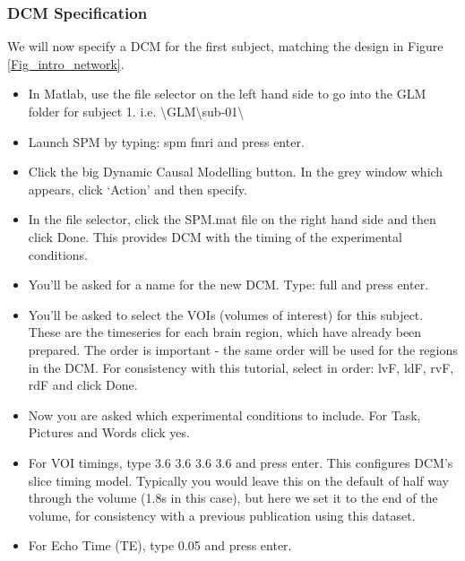 \documentclass{article}
\begin{document}
\subsubsection{DCM Specification} \label{GUI_specification}

We will now specify a DCM for the first subject, matching the design in Figure \ref{Fig_intro_network}.

\begin{itemize}
    
\item In Matlab, use the file selector on the left hand side to go into the GLM folder for subject 1. i.e. \textbackslash{GLM}\textbackslash{sub-01}\textbackslash

\item Launch SPM by typing: spm fmri and press enter.

\item Click the big Dynamic Causal Modelling button. In the grey window which appears, click `Action' and then specify.

\item In the file selector, click the SPM.mat file on the right hand side and then click Done. This provides DCM with the timing of the experimental conditions.

\item You'll be asked for a name for the new DCM. Type: full  and press enter.

\item You'll be asked to select the VOIs (volumes of interest) for this subject. These are the timeseries for each brain region, which have already been prepared. The order is important - the same order will be used for the regions in the DCM. For consistency with this tutorial, select in order: lvF, ldF, rvF, rdF and click Done.

\item Now you are asked which experimental conditions to include. For Task, Pictures and Words click yes.

\item For VOI timings, type 3.6  3.6  3.6  3.6 and press enter. This configures DCM's slice timing model. Typically you would leave this on the default of half way through the volume (1.8s in this case), but here we set it to the end of the volume, for consistency with a previous publication using this dataset.

\item For Echo Time (TE), type 0.05 and press enter.


\end{itemize}
\end{document}

